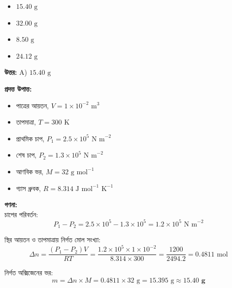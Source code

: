 \documentclass[12pt, a4paper]{article}
\begin{document}
\begin{itemize}[label={}, leftmargin=1cm, itemsep=0.5em]
    \item[\textbf{A)}] $15.40\text{ g}$
    \item[\textbf{B)}] $32.00\text{ g}$
    \item[\textbf{C)}] $8.50\text{ g}$
    \item[\textbf{D)}] $24.12\text{ g}$
\end{itemize}

\vspace{0.5em}
\begin{tcolorbox}[answerbox]
    \textbf{\color{success} উত্তর:} A) $15.40\text{ g}$
\end{tcolorbox}
\vspace{1em}

\begin{tcolorbox}[solutionbox={সমাধান (Solution)}]
    \noindent
    \textbf{প্রদত্ত উপাত্ত:}
    \begin{itemize}[leftmargin=1.5em, itemsep=0.2em]
        \item পাত্রের আয়তন, $V = 1 \times 10^{-2}\text{ m}^3$
        \item তাপমাত্রা, $T = 300\text{ K}$
        \item প্রাথমিক চাপ, $P_1 = 2.5 \times 10^5\text{ N m}^{-2}$
        \item শেষ চাপ, $P_2 = 1.3 \times 10^5\text{ N m}^{-2}$
        \item আণবিক ভর, $M = 32\text{ g mol}^{-1}$
        \item গ্যাস ধ্রুবক, $R = 8.314\text{ J mol}^{-1}\text{ K}^{-1}$
    \end{itemize}

    \vspace{0.6em}
    \noindent\textbf{গণনা:} \\
    চাপের পরিবর্তন:
    \[ P_1 - P_2 = 2.5 \times 10^5 - 1.3 \times 10^5 = 1.2 \times 10^5\text{ N m}^{-2} \]
    
    স্থির আয়তন ও তাপমাত্রায় নির্গত মোল সংখ্যা:
    \[ \Delta n = \frac{(P_1 - P_2) V}{R T} = \frac{1.2 \times 10^5 \times 1 \times 10^{-2}}{8.314 \times 300} = \frac{1200}{2494.2} = 0.4811\text{ mol} \]
    
    নির্গত অক্সিজেনের ভর:
    \[ m = \Delta n \times M = 0.4811 \times 32\text{ g} = 15.395\text{ g} \approx \mathbf{15.40\text{ g}} \]
\end{tcolorbox}
\end{document}
